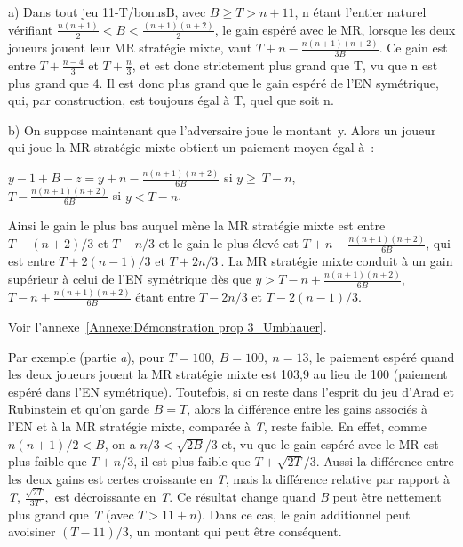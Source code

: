 \begin{Article}
\begin{refsection}[UmbhauerFR]

\begin{proposition}

a) Dans tout jeu 11-T/bonusB, avec \(B \geq T > n + 11\), n
étant l'entier naturel vérifiant \(\frac{n(n + 1)}{2} < B < \frac{(n + 1)(n + 2)}{2}\), le gain espéré avec le MR, lorsque les deux joueurs jouent leur MR stratégie
mixte, vaut \(T + n - \frac{n(n + 1)(n + 2)}{3B}\). Ce gain est
entre \(T + \frac{n - 4}{3}\) et \(T + \frac{n}{3}\), et
est donc strictement plus grand que T, vu que n est plus grand que 4. Il
est donc plus grand que le gain espéré de l'EN symétrique, qui, par
construction, est toujours égal à T, quel que soit n. \par
b) On suppose maintenant que l'adversaire joue le montant~y. Alors un joueur qui joue la MR stratégie mixte obtient un paiement moyen égal à~:

{\centering
\(y - 1 + B - z = y + n - \frac{n(n + 1)(n + 2)}{6B}\) si \(y \geq \ T - n\),\\
\(T - \frac{n(n + 1)(n + 2)}{6B}\) si \(y < T - n\).\par}

Ainsi le gain le plus bas auquel mène la MR stratégie mixte est
entre \(T - (n + 2)/3\) et \(T - n/3\) et le gain le plus
élevé est \(T + n - \frac{n(n + 1)(n + 2)}{6B}\), qui est entre
\(T + 2(n - 1)/3\) et \(T + 2n/3\ \). La MR stratégie mixte
conduit à un gain supérieur à celui de l'EN symétrique dès que
\(y > T - n + \frac{n(n + 1)(n + 2)}{6B}\), \(T - n + \frac{n(n + 1)(n + 2)}{6B}\)
étant entre \(T - 2n/3\) et \(T - 2(n - 1)/3\).    
\end{proposition}

\begin{demonstration}
    Voir l'annexe~\ref{Annexe:Démonstration prop 3_Umbhauer}. \quad \blacksquare
\end{demonstration}

Par exemple (partie \emph{a}), pour \(T = 100,\ B = 100,\ n = 13\), le
paiement espéré quand les deux joueurs jouent la MR stratégie mixte est
103,9 au lieu de 100 (paiement espéré dans l'EN symétrique). Toutefois,
si on reste dans l'esprit du jeu d'Arad et Rubinstein et qu'on garde
\(B = T\), alors la différence entre les gains associés à l'EN et à la
MR stratégie mixte, comparée à \emph{T}, reste faible. En effet, comme
\(n(n + 1)/2 < B\), on a \(n/3 < \sqrt{2B}/3\) et, vu que le gain espéré
avec le MR est plus faible que \(T + n/3\), il est plus faible que
\(T + \sqrt{2T}/3\). Aussi la différence entre les deux gains est certes
croissante en \emph{T}, mais la différence relative par rapport à
\emph{T}, \(\frac{\sqrt{2T}}{3T},\) est décroissante en \emph{T}. Ce
résultat change quand \emph{B} peut être nettement plus grand que
\emph{T} (avec \(T > 11 + n\)). Dans ce cas, le gain additionnel peut
avoisiner \((T - 11)/3\), un montant qui peut être conséquent.


\end{refsection}
\end{Article}
